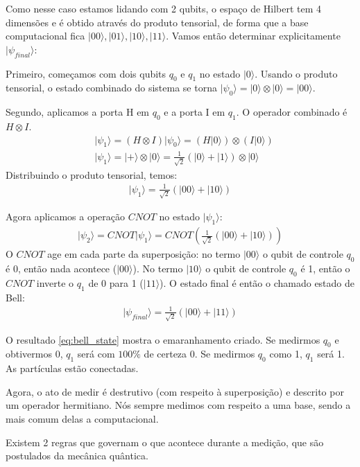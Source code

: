 \documentclass[12pt, a4paper]{article}
\newcommand{\ket}[1]{\lvert #1 \rangle}
\begin{document}
Como nesse caso estamos lidando com 2 qubits, o espaço de Hilbert tem 4 dimensões e é obtido através do produto tensorial, de forma que a base computacional fica \(\ket{00}, \ket{01}, \ket{10}, \ket{11}\). Vamos então determinar explicitamente $\ket{\psi_{final}}$:

Primeiro, começamos com dois qubits $q_0$ e $q_1$ no estado $\ket{0}$. Usando o produto tensorial, o estado combinado do sistema se torna \(\ket{\psi_0} = \ket{0} \otimes \ket{0} = \ket{00}\).

Segundo, aplicamos a porta H em $q_0$ e a porta I em $q_1$. O operador combinado é $H \otimes I$. 
\begin{align}
    &\ket{\psi_1} = (H \otimes I) \ket{\psi_0} = (H\ket{0}) \otimes (I\ket{0}) \\
    &\ket{\psi_1} = \ket{+} \otimes \ket{0} = \frac{1}{\sqrt{2}}(\ket{0}+\ket{1}) \otimes \ket{0}
\end{align}
Distribuindo o produto tensorial, temos:
\begin{align}
    \ket{\psi_1} = \frac{1}{\sqrt{2}} (\ket{00} + \ket{10})
\end{align}

Agora aplicamos a operação $CNOT$ no estado $\ket{\psi_1}$:
\begin{align}
    \ket{\psi_2} = CNOT\ket{\psi_1} = CNOT\left(\frac{1}{\sqrt{2}}(\ket{00} + \ket{10})\right)
\end{align}
O $CNOT$ age em cada parte da superposição: no termo $\ket{00}$ o qubit de controle $q_0$ é 0, então nada acontece ($\ket{00}$). No termo $\ket{10}$ o qubit de controle $q_0$ é 1, então o $CNOT$ inverte o $q_1$ de 0 para 1 ($\ket{11}$). O estado final é então o chamado estado de Bell:
\begin{align}
    \ket{\psi_{final}} = \frac{1}{\sqrt{2}}(\ket{00} + \ket{11})
    \label{eq:bell_state}
\end{align}

O resultado \eqref{eq:bell_state} mostra o emaranhamento criado. Se medirmos $q_0$ e obtivermos 0, $q_1$ será com $100\%$ de certeza 0. Se medirmos $q_0$ como 1, $q_1$ será 1. As partículas estão conectadas.

Agora, o ato de medir é destrutivo (com respeito à superposição) e descrito por um operador hermitiano. Nós sempre medimos com respeito a uma base, sendo a mais comum delas a computacional. 

Existem 2 regras que governam o que acontece durante a medição, que são postulados da mecânica quântica.
\end{document}
